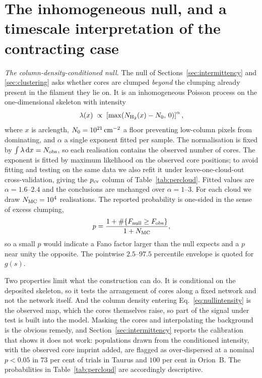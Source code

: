 \documentclass[usenatbib,twoside,twocolumn]{mnras}
\begin{document}
\section{The inhomogeneous null, and a timescale interpretation of the contracting case}
\label{sec:nullspec}

\emph{The column-density-conditioned null.} The null of Sections~\ref{sec:intermittency} and \ref{sec:clustering} asks whether cores are clumped \emph{beyond} the clumping already present in the filament they lie on. It is an inhomogeneous Poisson process on the one-dimensional skeleton with intensity
\begin{equation}
\lambda(x)\;\propto\;\left[\max\!\left(N_{\rm H_2}(x)-N_0,\,0\right)\right]^{\alpha},
\label{eq:nullintensity}
\end{equation}
where $x$ is arclength, $N_0=10^{21}\,{\rm cm^{-2}}$ a floor preventing low-column pixels from dominating, and $\alpha$ a single exponent fitted per sample. The normalisation is fixed by $\int\lambda\,{\rm d}x=N_{\rm obs}$, so each realisation contains the observed number of cores. The exponent is fitted by maximum likelihood on the observed core positions; to avoid fitting and testing on the same data we also refit it under leave-one-cloud-out cross-validation, giving the $p_{\rm cv}$ column of Table~\ref{tab:percloud}. Fitted values are $\alpha=1.6$--$2.4$ and the conclusions are unchanged over $\alpha=1$--$3$. For each cloud we draw $N_{\rm MC}=10^4$ realisations. The reported probability is one-sided in the sense of excess clumping,
\begin{equation}
p=\frac{1+\#\{F_{\rm null}\geq F_{\rm obs}\}}{1+N_{\rm MC}},
\label{eq:pval}
\end{equation}
so a small $p$ would indicate a Fano factor larger than the null expects and a $p$ near unity the opposite. The pointwise $2.5$--$97.5$ percentile envelope is quoted for $g(s)$.

Two properties limit what the construction can do. It is conditional on the deposited skeleton, so it tests the arrangement of cores along a fixed network and not the network itself. And the column density entering Eq.~\ref{eq:nullintensity} is the observed map, which the cores themselves raise, so part of the signal under test is built into the model. Masking the cores and interpolating the background is the obvious remedy, and Section~\ref{sec:intermittency} reports the calibration that shows it does not work: populations drawn from the conditioned intensity, with the observed core imprint added, are flagged as over-dispersed at a nominal $p<0.05$ in $73$ per cent of trials in Taurus and $100$ per cent in Orion~B. The probabilities in Table~\ref{tab:percloud} are accordingly descriptive.
\end{document}
